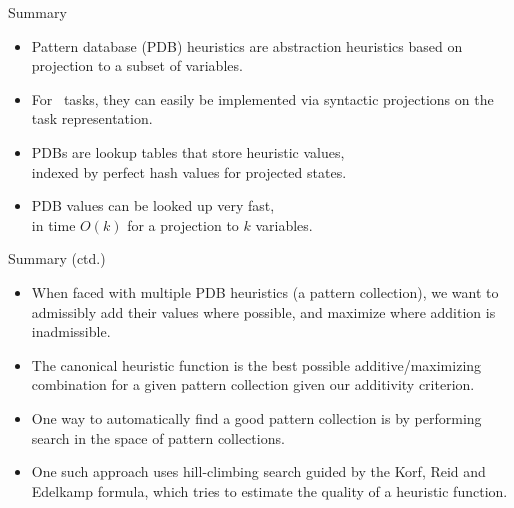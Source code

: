 \documentclass{gkibeamer}
\begin{document}
\begin{frame}{Summary}
  \begin{itemize}
  \item \alert{Pattern database (PDB) heuristics} are abstraction
    heuristics based on \alert{projection} to a subset of variables.
  \item For \sasplus\ tasks, they can easily be implemented via
    \alert{syntactic projections} on the task representation.
  \item PDBs are \alert{lookup tables} that store heuristic values, \\
    indexed by \alert{perfect hash values} for projected states.
  \item PDB values can be looked up \alert{very fast}, \\
    in time $O(k)$ for a projection to $k$ variables.
  \end{itemize}
\end{frame}

\begin{frame}{Summary (ctd.)}
  \begin{itemize}
  \item When faced with multiple PDB heuristics (a \alert{pattern
    collection}), we want to \alert{admissibly add} their values where
    possible, and \alert{maximize} where addition is inadmissible.
  \item The \alert{canonical heuristic function} is the \alert{best
    possible} additive/maximizing combination for a given pattern
    collection given our additivity criterion.
  \item One way to \alert{automatically find a good pattern
    collection} is by performing \alert{search in the space of
    pattern collections}.
  \item One such approach uses hill-climbing search guided by the
    \alert{Korf, Reid and Edelkamp formula}, which tries to estimate
    the quality of a heuristic function.
  \end{itemize}
\end{frame}
\end{document}
